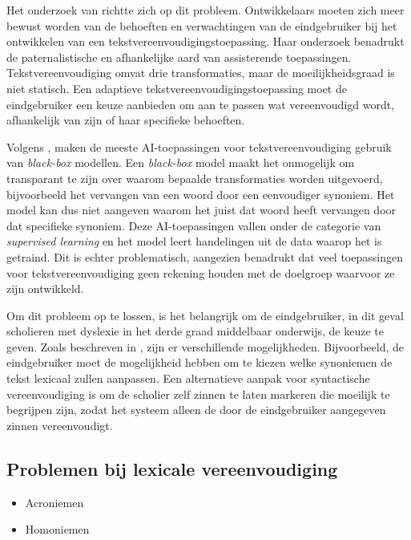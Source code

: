 Het onderzoek van \textcite{Gooding2022} richtte zich op dit probleem. Ontwikkelaars moeten zich meer bewust worden van de behoeften en verwachtingen van de eindgebruiker bij het ontwikkelen van een tekstvereenvoudigingstoepassing. Haar onderzoek benadrukt de paternalistische en afhankelijke aard van assisterende toepassingen. Tekstvereenvoudiging omvat drie transformaties, maar de moeilijkheidsgraad is niet statisch. Een adaptieve tekstvereenvoudigingstoepassing moet de eindgebruiker een keuze aanbieden om aan te passen wat vereenvoudigd wordt, afhankelijk van zijn of haar specifieke behoeften.

Volgens \textcite{Punardeep2020}, maken de meeste AI-toepassingen voor tekstvereenvoudiging gebruik van \textit{black-box} modellen. Een \textit{black-box} model maakt het onmogelijk om transparant te zijn over waarom bepaalde transformaties worden uitgevoerd, bijvoorbeeld het vervangen van een woord door een eenvoudiger synoniem. Het model kan dus niet aangeven waarom het juist dat woord heeft vervangen door dat specifieke synoniem. Deze AI-toepassingen vallen onder de categorie van \textit{supervised learning} en het model leert handelingen uit de data waarop het is getraind. Dit is echter problematisch, aangezien \textcite{Xu2015} benadrukt dat veel toepassingen voor tekstvereenvoudiging geen rekening houden met de doelgroep waarvoor ze zijn ontwikkeld.

Om dit probleem op te lossen, is het belangrijk om de eindgebruiker, in dit geval scholieren met dyslexie in het derde graad middelbaar onderwijs, de keuze te geven. Zoals beschreven in \textcite{Gooding2022}, zijn er verschillende mogelijkheden. Bijvoorbeeld, de eindgebruiker moet de mogelijkheid hebben om te kiezen welke synoniemen de tekst lexicaal zullen aanpassen. Een alternatieve aanpak voor syntactische vereenvoudiging is om de scholier zelf zinnen te laten markeren die moeilijk te begrijpen zijn, zodat het systeem alleen de door de eindgebruiker aangegeven zinnen vereenvoudigt.


\subsection{Problemen bij lexicale vereenvoudiging}

\begin{itemize}
	\item Acroniemen
	\item Homoniemen
\end{itemize}

